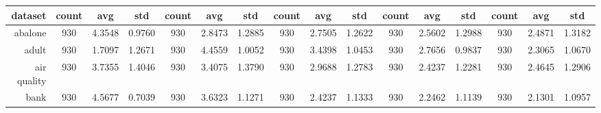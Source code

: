 \begin{table}[H]
{\begin{tabular}{rccccccccccccccc}
			\cmidrule{2-16}    \textbf{dataset} & \textbf{count}                           & \textbf{avg}                                                              & \textbf{std}    & \textbf{count}                 & \textbf{avg}    & \textbf{std}    & \textbf{count}                  & \textbf{avg}    & \textbf{std}    & \textbf{count}                  & \textbf{avg}                                                              & \textbf{std}    & \textbf{count}                  & \textbf{avg}                                                                       & \textbf{std}    \\
			\midrule
			abalone                             & 930                                      & 4.3548                                                                    & 0.9760          & 930                            & 2.8473          & 1.2885          & 930                             & 2.7505          & 1.2622          & 930                             & 2.5602                                                                    & 1.2988          & 930                             & \cellcolor[rgb]{ .776,  .937,  .808}\textcolor[rgb]{ 0,  .38,  0}{2.4871}          & 1.3182          \\
			adult                               & 930                                      & \cellcolor[rgb]{ .776,  .937,  .808}\textcolor[rgb]{ 0,  .38,  0}{1.7097} & 1.2671          & 930                            & 4.4559          & 1.0052          & 930                             & 3.4398          & 1.0453          & 930                             & 2.7656                                                                    & 0.9837          & 930                             & 2.3065                                                                             & 1.0670          \\
			air quality                         & 930                                      & 3.7355                                                                    & 1.4046          & 930                            & 3.4075          & 1.3790          & 930                             & 2.9688          & 1.2783          & 930                             & \cellcolor[rgb]{ .776,  .937,  .808}\textcolor[rgb]{ 0,  .38,  0}{2.4237} & 1.2281          & 930                             & 2.4645                                                                             & 1.2906          \\
			bank                                & 930                                      & 4.5677                                                                    & 0.7039          & 930                            & 3.6323          & 1.1271          & 930                             & 2.4237          & 1.1333          & 930                             & 2.2462                                                                    & 1.1139          & 930                             & \cellcolor[rgb]{ .776,  .937,  .808}\textcolor[rgb]{ 0,  .38,  0}{2.1301}          & 1.0957          \\

\end{tabular}}
\end{table}
